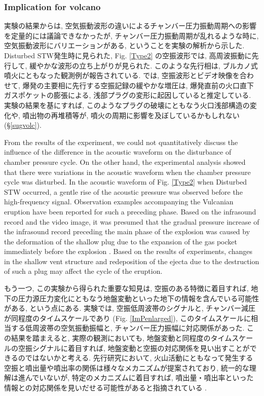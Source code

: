 \documentclass[12pt]{article}
\begin{document}
\clearpage
\subsubsection{Implication for volcano}\label{acoshisa}
実験の結果からは, 空気振動波形の違いによるチャンバー圧力振動周期への影響を定量的には議論できなかったが, チャンバー圧力振動周期が乱れるような時に, 空気振動波形にバリエーションがある, ということを実験の解析から示した.
Disturbed STW発生時に見られた, Fig. \ref{Type2} の空振波形では, 高周波振動に先行して, 緩やかな波形の立ち上がりが見られた. 
このような先行相は, ブルカノ式噴火にともなった観測例が報告されている.
 \cite{Yokoo2009}では, 空振波形とビデオ映像を合わせて, 爆発の主要相に先行する空振記録の緩やかな増圧は, 爆発直前の火口直下ガスポケットの膨張による, 浅部プラグの変形に起因していると推定している. 
実験の結果を基にすれば, このようなプラグの破壊にともなう火口浅部構造の変化や, 噴出物の再堆積等が, 噴火の周期に影響を及ぼしているかもしれない (\S \ref{sugvolc}). 

From the results of the experiment, we could not quantitatively discuss the influence of the difference in the acoustic waveform on the disturbance of chamber pressure cycle.
On the other hand, the experimental analysis showed that there were variations in the acoustic waveform when the chamber pressure cycle was disturbed.
In the acoustic waveform of Fig. \ref{Type2} when Disturbed STW occurred, a gentle rise of the acoustic pressure was observed before the high-frequency signal.
Observation examples accompanying the Vulcanian eruption have been reported for such a preceding phase.
Based on the infrasound record and the video image, it was presumed that the gradual pressure increase of the infrasound record preceding the main phase of the explosion was caused by the deformation of the shallow plug due to the expansion of the gas pocket immediately before the explosion \citep{Yokoo2009}.
Based on the results of experiments, changes in the shallow vent structure and redeposition of the ejecta due to the destruction of such a plug may affect the cycle of the eruption.

もう一つ, この実験から得られた重要な知見は, 空振のある特徴に着目すれば, 地下の圧力源圧力変化にともなう地盤変動といった地下の情報を含んでいる可能性がある, という点にある.
実験では, 空振低周波帯のシグナルと, チャンバー減圧が同程度のタイムスケールであり (Fig. \ref{ImPenlarged}), このタイムスケールに相当する低周波帯の空気振動振幅と, チャンバー圧力振幅に対応関係があった. 
この結果を踏まえると, 実際の観測においても, 地盤変動と同程度のタイムスケールの空振シグナルに着目すれば, 地盤変動と空振の対応関係を見い出すことができるのではないかと考える.
先行研究において, 火山活動にともなって発生する空振と噴出量や噴出率の関係は様々なメカニズムが提案されており, 統一的な理解は進んでいないが, 特定のメカニズムに着目すれば, 噴出量・噴出率といった情報との対応関係を見いだせる可能性があると指摘されている \citep{Ichihara2016a}.
\end{document}
